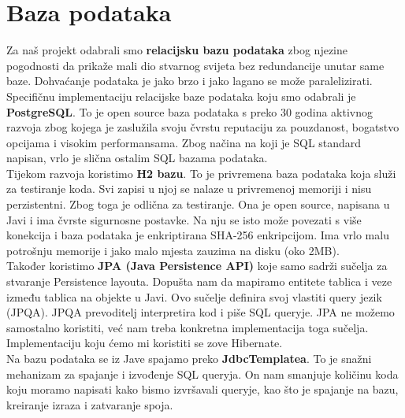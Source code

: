 		\section{Baza podataka}
			
		Za naš projekt odabrali smo \textbf{relacijsku bazu podataka} zbog njezine pogodnosti da prikaže mali dio stvarnog svijeta bez redundancije unutar same baze. Dohvaćanje podataka je jako brzo i jako lagano se može paralelizirati. Specifičnu implementaciju relacijske baze podataka koju smo odabrali je \textbf{PostgreSQL}. To je open source baza podataka s preko 30 godina aktivnog razvoja zbog kojega je zaslužila svoju čvrstu reputaciju za pouzdanost, bogatstvo opcijama i visokim performansama. Zbog načina na koji je SQL standard napisan, vrlo je slična ostalim SQL bazama podataka.\\ 
		
		Tijekom razvoja koristimo \textbf{H2 bazu}. To je privremena baza podataka koja služi za testiranje koda. Svi zapisi u njoj se nalaze u privremenoj memoriji i nisu perzistentni. Zbog toga je odlična za testiranje. Ona je open source, napisana u Javi i ima čvrste sigurnosne postavke. Na nju se isto može povezati s više konekcija i baza podataka je enkriptirana SHA-256 enkripcijom. Ima vrlo malu potrošnju memorije i jako malo mjesta zauzima na disku (oko 2MB). \\ 
		
		Također koristimo \textbf{JPA (Java Persistence API)} koje samo sadrži sučelja za stvaranje Persistence layouta. Dopušta nam da mapiramo entitete tablica i veze između tablica na objekte u Javi. Ovo sučelje definira svoj vlastiti query jezik (JPQA). JPQA prevoditelj interpretira kod i piše SQL queryje. JPA ne možemo samostalno koristiti, već nam treba konkretna implementacija toga sučelja. Implementaciju koju ćemo mi koristiti se zove Hibernate. \\ 
		
		Na bazu podataka se iz Jave spajamo preko \textbf{JdbcTemplatea}. To je snažni mehanizam za spajanje i izvođenje SQL queryja. On nam smanjuje količinu koda koju moramo napisati kako bismo izvršavali queryje, kao što je spajanje na bazu, kreiranje izraza i zatvaranje spoja. \\
		
